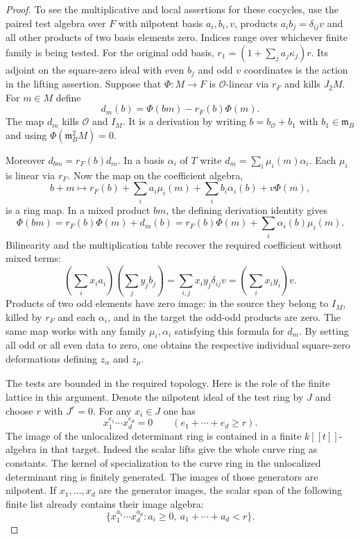 \begin{proof}
To see the multiplicative and local assertions for
these cocycles, use the paired test algebra over \(F\) with nilpotent basis
\(a_i,b_i,v\), products \(a_i b_j=\delta_{ij}v\) and all other
products of two basis elements zero. Indices range over whichever
finite family is being tested. For the original odd basis,
\(r_1=(1+\sum_j a_j\kappa_j)r\). Its adjoint on the square-zero
ideal with even \(b_j\) and odd \(v\) coordinates is the action
in the lifting assertion. Suppose that
\(\Phi:M\to F\) is \(\mathcal O\)-linear via \(r_F\)
and kills \(J_2M\). For \(m\in M\) define
\[
       d_m(b)=\Phi(bm)-r_F(b)\Phi(m).
\]
The map \(d_m\) kills \(\mathcal O\) and \(I_M\).
It is a derivation by writing
\(b=b_{\mathcal O}+b_1\) with \(b_1\in\mathfrak m_B\)
and using \(\Phi(\mathfrak m_B^2M)=0\).

Moreover \(d_{bm}=r_F(b)d_m\).
In a basis \(\alpha_i\) of \(T\) write
\(d_m=\sum_i\mu_i(m)\alpha_i\).
Each \(\mu_i\) is linear via \(r_F\).
Now the map on the coefficient algebra,
\[
 b+m\longmapsto
 r_F(b)+\sum_i a_i\mu_i(m)+\sum_i b_i\alpha_i(b)+v\Phi(m),
\]
is a ring map. In a mixed product \(bm\), the defining
derivation identity gives
\[
 \Phi(bm)=r_F(b)\Phi(m)+d_m(b)
         =r_F(b)\Phi(m)+\sum_i\alpha_i(b)\mu_i(m).
\]
Bilinearity and the multiplication table recover the required coefficient without mixed terms:
\[
 \left(\sum_i x_i a_i\right)\left(\sum_j y_j b_j\right)=\sum_{i,j}x_i y_j\delta_{ij}v=\left(\sum_i x_i y_i\right)v .
\] Products of
two odd elements have zero image: in the source they belong
to \(I_M\), killed by \(r_F\) and each \(\alpha_i\), and in
the target the odd-odd products are zero.
The same map works with any family \(\mu_i,\alpha_i\)
satisfying this formula for \(d_m\). By setting all
odd or all even data to zero, one obtains the respective
individual square-zero deformations defining
\(z_\alpha\) and \(z_\mu\).  \label{cor:ordinary-patching-cotangent-5}

The tests are bounded in the required topology.
Here is the role of the finite lattice in this argument.
Denote the nilpotent ideal of the test ring by \(J\) and choose \(r\) with \(J^r=0\). For any \(x_i\in J\) one has 
\[
 x_1^{e_1}\cdots x_d^{e_d}=0\qquad(e_1+\cdots+e_d\ge r).
\]
 The image of the unlocalized
determinant ring is contained in a finite
\(k[[t]]\)-algebra in that target. Indeed the scalar lifts
give the whole curve ring as constants. The kernel
of specialization to the curve ring in the unlocalized
determinant ring is finitely generated. The images
of those generators are nilpotent. If \(x_1,\ldots,x_d\) are the generator images, the scalar span of the following finite list already contains their image algebra:
\[
 \{x_1^{a_1}\cdots x_d^{a_d}:a_i\ge0,\ a_1+\cdots+a_d<r\}.
\]


\end{proof}
